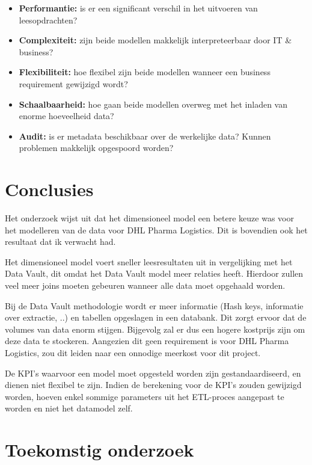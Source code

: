 \documentclass[a0,portrait]{a0poster}
\begin{document}
\begin{multicols}{2}
\begin{itemize}
	\item \textbf{Performantie:} is er een significant verschil in het uitvoeren van leesopdrachten?
	\item \textbf{Complexiteit:} zijn beide modellen makkelijk interpreteerbaar door IT \& business?
	\item \textbf{Flexibiliteit:} hoe flexibel zijn beide modellen wanneer een business requirement gewijzigd wordt?
	\item \textbf{Schaalbaarheid:} hoe gaan beide modellen overweg met het inladen van enorme hoeveelheid data?
	\item \textbf{Audit:} is er metadata beschikbaar over de werkelijke data? Kunnen problemen makkelijk opgespoord worden?
\end{itemize} 


\color{HoGentAccent1} 
\section*{Conclusies}
\color{black}
Het onderzoek wijst uit dat het dimensioneel model een betere keuze was voor het modelleren van de data voor DHL Pharma Logistics. Dit is bovendien ook het resultaat dat ik verwacht had.

Het dimensioneel model voert sneller leesresultaten uit in vergelijking met het Data Vault, dit omdat het Data Vault model meer relaties heeft. Hierdoor zullen veel meer joins moeten gebeuren wanneer alle data moet opgehaald worden. 

Bij de Data Vault methodologie wordt er meer informatie (Hash keys, informatie over extractie, ..) en tabellen opgeslagen in een databank. Dit zorgt ervoor dat de volumes van data enorm stijgen. Bijgevolg zal er dus een hogere kostprijs zijn om deze data te stockeren. Aangezien dit geen requirement is voor DHL Pharma Logistics, zou dit leiden naar een onnodige meerkost voor dit project.

De KPI's waarvoor een model moet opgesteld worden zijn gestandaardiseerd, en dienen niet flexibel te zijn. Indien de berekening voor de KPI's zouden gewijzigd worden, hoeven enkel sommige parameters uit het ETL-proces aangepast te worden en niet het datamodel zelf.

\color{HoGentAccent1} 
\section*{Toekomstig onderzoek}
\color{black}


\end{multicols}
\end{document}
